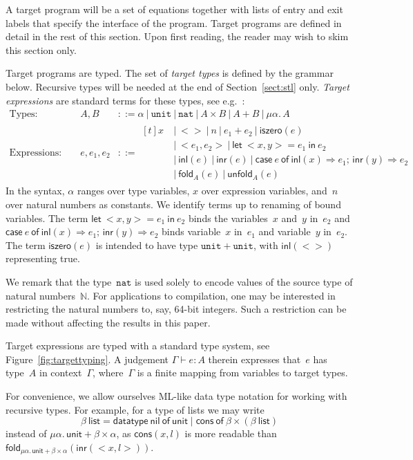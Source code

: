 \documentclass{LMCS}
\theoremstyle{definition}
\theoremstyle{plain}
\newcommand{\kw}[1]{\mathsf{#1}}
\newcommand{\NN}{\mathbb{N}}
\newcommand{\unit}{\mathtt{unit}}
\newcommand{\VN}{\mathtt{nat}}
\newcommand{\Mid}{\ \mathrel{\big|} \ }
\newcommand{\SeqTm}[3]{#1 \vdash #2 \colon #3}
\newcommand{\tlet}[3]{\kw{let}\ #2=#1\ \kw{in}\ #3}
\newcommand{\tcase}[5]{\kw{case}\ #1\ \kw{of}\ \kw{inl}(#2) \Rightarrow #3;\, \kw{inr}(#4) \Rightarrow #5}
\begin{document}
A target program will be a set of equations
together with lists of entry and exit labels that specify the
interface of the program. Target programs are defined in detail in the
rest of this section. Upon first reading, the reader may wish to skim
this section only.

Target programs are typed.
The set of \emph{target types} is defined by the grammar below.
Recursive types will be needed at the end of Section~\ref{sect:stl} only.
\emph{Target expressions} are standard terms for these types, see
e.g.~\cite{pierce}:
\begin{align*}
  \text{Types: } && 
   A, B &::= \alpha \Mid \unit \Mid \VN \Mid A \times B \Mid A + B \Mid \mu \alpha.\, A\\
  \text{Expressions: } && e,e_1,e_2 &::= 
    \begin{aligned}[t]
      x &\Mid <>
      \Mid n \Mid e_1 + e_2 \Mid \kw{iszero}(e) \\
      &
      \Mid <e_1, e_2> \Mid \tlet {e_1} {<x, y>} {e_2}\\
      &
      \Mid \kw{inl}(e) \Mid \kw{inr}(e) 
      \Mid \tcase {e} x {e_1} y {e_2}\\
      &
      \Mid \kw{fold}_A(e) \Mid \kw{unfold}_A(e)
    \end{aligned}
  \end{align*}
In the syntax, $\alpha$ ranges over type variables, $x$ over expression variables, 
and~$n$ over natural numbers as constants. 
We identify terms up to renaming of bound variables. The term 
$\tlet {e_1} {<x, y>} {e_2}$ binds the variables~$x$ and~$y$ in~$e_2$ and
$\tcase {e} x {e_1} y {e_2}$ binds variable~$x$ in~$e_1$ and variable~$y$ in~$e_2$.
The term
$\kw{iszero}(e)$ is intended to have type $\unit+\unit$, with $\kw{inl}(<>)$
representing true.

We remark that the type~$\VN$ is used solely to encode values of the source
type of natural numbers~$\NN$. 
For applications to compilation, one may be
interested in restricting the natural numbers to, say, 64-bit integers.
Such a restriction can be made without affecting the results in this paper. 

Target expressions are typed with a standard type system, see Figure~\ref{fig:targettyping}.
A judgement $\SeqTm{\Gamma}{e}{A}$ therein expresses that~$e$ has type~$A$ in
context~$\Gamma$, where~$\Gamma$ is a finite mapping from variables to target
types.

For convenience, we allow ourselves ML-like data type notation
for working with recursive types. For example, for a type of 
lists we may write 
\[
  \beta\ \kw{list} = \kw{datatype}\ \kw{nil}\ \kw{of}\ \kw{unit} \mid
  \kw{cons}\ \kw{of}\ \beta \times (\beta\ \kw{list})
\]
instead of $\mu \alpha. \, \kw{unit} + \beta \times \alpha$, as 
$\kw{cons}(x,l)$ is
more readable than
$\kw{fold}_{\mu \alpha. \, \kw{unit} + \beta \times \alpha}(\kw{inr}(<x, l>))$.
\end{document}
